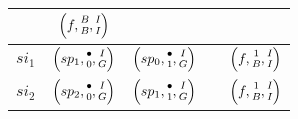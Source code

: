 \begin{center}
\begin{tabular}{|c||c|c|c|c|}
			& $\left(f    , \twocoord{B}{B}       , \twocoord{I}{I} \right)$
			&                                                                \\
		\hline
		$si_1$ 
			& $\left(sp_1 , \twocoord{\bullet}{0} , \twocoord{I}{G} \right)$ 
			& $\left(sp_0 , \twocoord{\bullet}{1} , \twocoord{I}{G} \right)$
			&
			& $\left(f    , \twocoord{1}{B}       , \twocoord{I}{I} \right)$ \\
		\hline
		$si_2$ 
			& $\left(sp_2 , \twocoord{\bullet}{0} , \twocoord{I}{G} \right)$ 
			& $\left(sp_1 , \twocoord{\bullet}{1} , \twocoord{I}{G} \right)$
			&
			& $\left(f    , \twocoord{1}{B}       , \twocoord{I}{I} \right)$ \\
		\hline
	\end{tabular}
\end{center}

